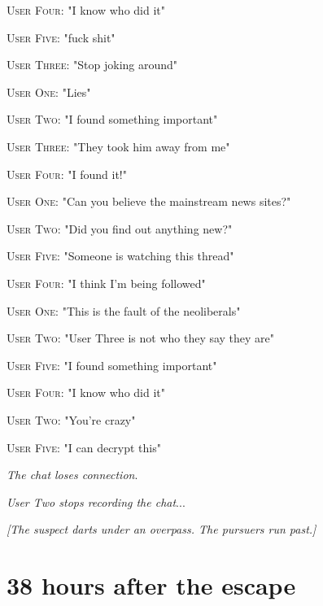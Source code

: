 \documentclass{report}
\begin{document}
\textsc{User Four}: "I know who did it" 

\textsc{User Five}: "fuck shit" 

\textsc{User Three}: "Stop joking around" 

\textsc{User One}: "Lies" 

\textsc{User Two}: "I found something important" 

\textsc{User Three}: "They took him away from me" 

\textsc{User Four}: "I found it!" 

\textsc{User One}: "Can you believe the mainstream news sites?" 

\textsc{User Two}: "Did you find out anything new?" 

\textsc{User Five}: "Someone is watching this thread" 

\textsc{User Four}: "I think I'm being followed" 

\textsc{User One}: "This is the fault of the neoliberals" 

\textsc{User Two}: "User Three is not who they say they are" 

\textsc{User Five}: "I found something important" 

\textsc{User Four}: "I know who did it" 

\textsc{User Two}: "You're crazy" 

\textsc{User Five}: "I can decrypt this" 

\textit{The chat loses connection}. 

\textit{User Two stops recording the chat}...

\textit{[The suspect darts under an overpass. The pursuers run past.]}


\section*{38 \small{hours after the escape}}
\end{document}

